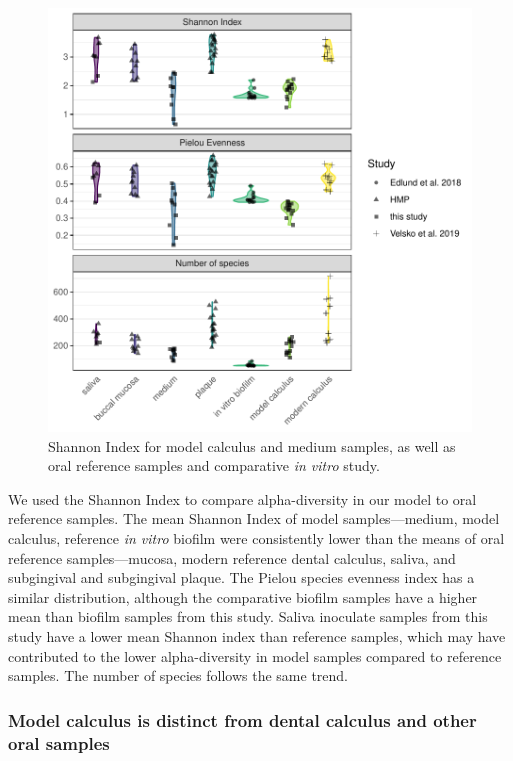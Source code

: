 \documentclass[
  b5paper,
]{book}
\begin{document}
\begin{figure}

{\centering \includegraphics{figures/byoc-valid-fig-shannon-compar-1.pdf}

}

\caption{\label{fig-shannon-compar}Shannon Index for model calculus and
medium samples, as well as oral reference samples and comparative
\emph{in vitro} study.}

\end{figure}

We used the Shannon Index to compare alpha-diversity in our model to
oral reference samples. The mean Shannon Index of model
samples---medium, model calculus, reference \emph{in vitro} biofilm were
consistently lower than the means of oral reference samples---mucosa,
modern reference dental calculus, saliva, and subgingival and
subgingival plaque. The Pielou species evenness index has a similar
distribution, although the comparative biofilm samples have a higher
mean than biofilm samples from this study. Saliva inoculate samples from
this study have a lower mean Shannon index than reference samples, which
may have contributed to the lower alpha-diversity in model samples
compared to reference samples. The number of species follows the same
trend.

\hypertarget{model-calculus-is-distinct-from-dental-calculus-and-other-oral-samples}{%
\subsubsection{Model calculus is distinct from dental calculus and other
oral
samples}\label{model-calculus-is-distinct-from-dental-calculus-and-other-oral-samples}}
\end{document}
